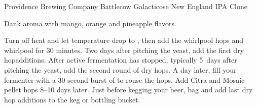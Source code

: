 \begin{recipe}{Providence Brewing Company Battlecow Galacticose New England IPA Clone}

\begin{aboutblock}
Dank aroma with mango, orange and pineapple flavors. \sourceaha
\end{aboutblock}


\begin{methodandtiming}
 
\begin{mashsteps}
\end{mashsteps}

\begin{fermentationsteps}
\end{fermentationsteps}

\begin{directions}
Turn off heat and let temperature drop to , then add the whirlpool
hops and whirlpool for 30 minutes. Two days after pitching the yeast, add the
first dry hopadditions. After active fermentation has stopped, typically 5~days
after pitching the yeast, add the second round of dry hops. A day later, fill your
fermenter with a 30 second burst of  to rouse the hops. Add 
Citra and  Mosaic pellet hops 8--10 days later. Just before kegging
your beer, bag and add last dry hop additions to the keg or bottling bucket.
\end{directions}

\end{methodandtiming}

\recipebreak

\begin{ingredientsblock}

\begin{malts}
\end{malts}

\begin{hops}
\end{hops}


\end{ingredientsblock}
\end{recipe}
